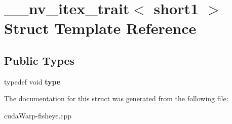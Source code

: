 \hypertarget{struct____nv__itex__trait_3_01short1_01_4}{}\section{\+\_\+\+\_\+nv\+\_\+itex\+\_\+trait$<$ short1 $>$ Struct Template Reference}
\label{struct____nv__itex__trait_3_01short1_01_4}
\subsection*{Public Types}
\begin{DoxyCompactItemize}
\item 
typedef void {\bfseries type}\hypertarget{struct____nv__itex__trait_3_01short1_01_4_a6141e30e3dc2819044d4ed36bb8c2554}{}\label{struct____nv__itex__trait_3_01short1_01_4_a6141e30e3dc2819044d4ed36bb8c2554}

\end{DoxyCompactItemize}


The documentation for this struct was generated from the following file\+:\begin{DoxyCompactItemize}
\item 
cuda\+Warp-\/fisheye.\+cpp\end{DoxyCompactItemize}
